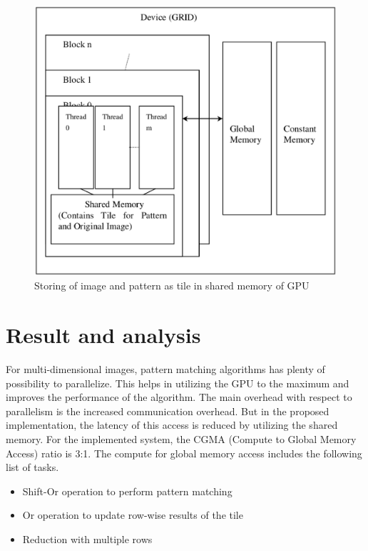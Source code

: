 \documentclass[graybox]{svmult}
\begin{document}
\begin{figure}
\sidecaption
\includegraphics[scale=.50]{GPUin.eps}
%
%
\caption{Storing of image and pattern as tile in shared memory of GPU}
\label{fig:1}       %
\end{figure}

\section{Result and analysis}
\label{sec:4}
For multi-dimensional images, pattern matching algorithms has plenty of possibility to parallelize. This helps in utilizing the GPU to the maximum and improves the performance of the algorithm. The main overhead with respect to parallelism is the increased communication overhead. But in the proposed implementation, the latency of this access is reduced by utilizing the shared memory. For the implemented system, the CGMA (Compute to Global Memory Access) ratio is 3:1. The compute for global
memory access includes the following list of tasks.

\begin{itemize}
\item{Shift-Or operation to perform pattern matching}
\item{Or operation to update row-wise results of the tile}
\item{Reduction with multiple rows}
\end{itemize}
\end{document}
